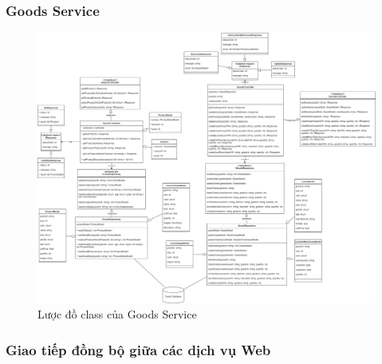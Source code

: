 \subsubsection{Goods Service}
\begin{figure}[!htp]
	\centering
	\includegraphics[width=17cm]{img/Architecture/service/GoodsService.png}
	\newline
	\caption{Lược đồ class của Goods Service}
\end{figure}


\newpage
\subsubsection{Giao tiếp đồng bộ giữa các dịch vụ Web}

